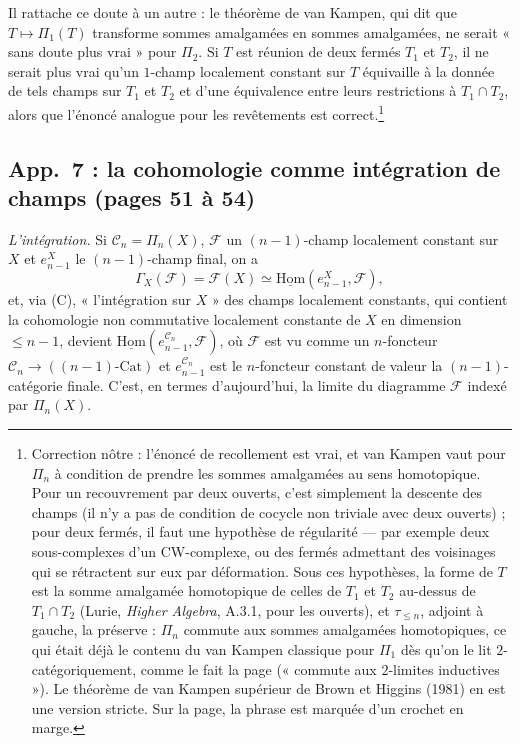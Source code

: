 \documentclass[11pt,a4paper]{article}
\begin{document}
Il rattache ce doute à un autre : le théorème de van Kampen, qui dit que
$T \mapsto \Pi_1(T)$ transforme sommes amalgamées en sommes amalgamées, ne
serait « sans doute plus vrai » pour $\Pi_2$. Si $T$ est réunion de deux
fermés $T_1$ et $T_2$, il ne serait plus vrai qu'un $1$-champ localement
constant sur $T$ équivaille à la donnée de tels champs sur $T_1$ et $T_2$
et d'une équivalence entre leurs restrictions à $T_1\cap T_2$, alors que
l'énoncé analogue pour les revêtements est correct.\footnote{Correction
nôtre : l'énoncé de recollement est vrai, et van Kampen vaut pour $\Pi_n$
à condition de prendre les sommes amalgamées au sens homotopique. Pour un
recouvrement par deux ouverts, c'est simplement la descente des champs (il
n'y a pas de condition de cocycle non triviale avec deux ouverts) ; pour
deux fermés, il faut une hypothèse de régularité --- par exemple deux
sous-complexes d'un CW-complexe, ou des fermés admettant des voisinages qui
se rétractent sur eux par déformation. Sous ces hypothèses, la forme de $T$
est la somme amalgamée homotopique de celles de $T_1$ et $T_2$ au-dessus de
$T_1\cap T_2$ (Lurie, \emph{Higher Algebra}, A.3.1, pour les ouverts), et
$\tau_{\leqslant n}$, adjoint à gauche, la préserve : $\Pi_n$ commute aux
sommes amalgamées homotopiques, ce qui était déjà le contenu du van Kampen
classique pour $\Pi_1$ dès qu'on le lit $2$-catégoriquement, comme le fait la
page (« commute aux $2$-limites inductives »). Le théorème de van Kampen
supérieur de Brown et Higgins (1981) en est une version stricte. Sur la
page, la phrase est marquée d'un crochet en marge.}

\subsection*{App.~7 : la cohomologie comme intégration de champs (pages 51 à 54)}

\emph{L'intégration.} Si $\mathcal{C}_n = \Pi_n(X)$, $\mathcal{F}$ un
$(n-1)$-champ localement constant sur $X$ et $e^X_{n-1}$ le $(n-1)$-champ
final, on a
\[
\Gamma_X(\mathcal{F}) = \mathcal{F}(X) \simeq \underline{\mathrm{Hom}}(e^X_{n-1},\mathcal{F}),
\]
et, via (C), « l'intégration sur $X$ » des champs localement constants, qui
contient la cohomologie non commutative localement constante de $X$ en
dimension $\leqslant n-1$, devient
$\underline{\mathrm{Hom}}(e^{\mathcal{C}_n}_{n-1},\mathcal{F})$, où
$\mathcal{F}$ est vu comme un $n$-foncteur
$\mathcal{C}_n \to ((n-1)\text{-}\mathrm{Cat})$ et $e^{\mathcal{C}_n}_{n-1}$
est le $n$-foncteur constant de valeur la $(n-1)$-catégorie finale. C'est,
en termes d'aujourd'hui, la limite du diagramme $\mathcal{F}$ indexé par
$\Pi_n(X)$.
\end{document}
